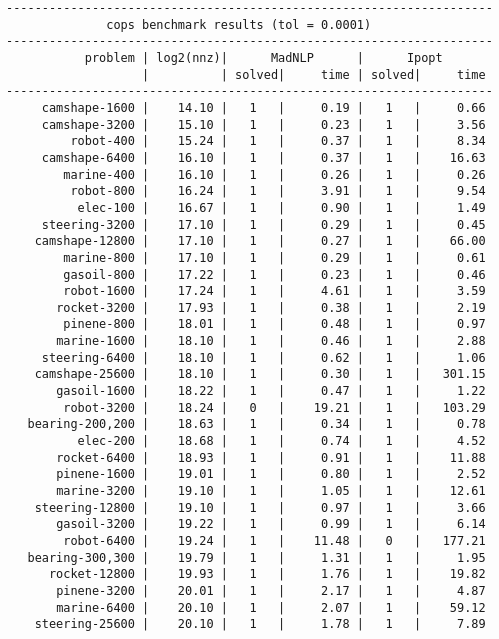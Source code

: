 \begin{lstlisting}
--------------------------------------------------------------------
              cops benchmark results (tol = 0.0001)
--------------------------------------------------------------------
           problem | log2(nnz)|      MadNLP      |      Ipopt        
                   |          | solved|     time | solved|     time     
--------------------------------------------------------------------
     camshape-1600 |    14.10 |   1   |     0.19 |   1   |     0.66
     camshape-3200 |    15.10 |   1   |     0.23 |   1   |     3.56
         robot-400 |    15.24 |   1   |     0.37 |   1   |     8.34
     camshape-6400 |    16.10 |   1   |     0.37 |   1   |    16.63
        marine-400 |    16.10 |   1   |     0.26 |   1   |     0.26
         robot-800 |    16.24 |   1   |     3.91 |   1   |     9.54
          elec-100 |    16.67 |   1   |     0.90 |   1   |     1.49
     steering-3200 |    17.10 |   1   |     0.29 |   1   |     0.45
    camshape-12800 |    17.10 |   1   |     0.27 |   1   |    66.00
        marine-800 |    17.10 |   1   |     0.29 |   1   |     0.61
        gasoil-800 |    17.22 |   1   |     0.23 |   1   |     0.46
        robot-1600 |    17.24 |   1   |     4.61 |   1   |     3.59
       rocket-3200 |    17.93 |   1   |     0.38 |   1   |     2.19
        pinene-800 |    18.01 |   1   |     0.48 |   1   |     0.97
       marine-1600 |    18.10 |   1   |     0.46 |   1   |     2.88
     steering-6400 |    18.10 |   1   |     0.62 |   1   |     1.06
    camshape-25600 |    18.10 |   1   |     0.30 |   1   |   301.15
       gasoil-1600 |    18.22 |   1   |     0.47 |   1   |     1.22
        robot-3200 |    18.24 |   0   |    19.21 |   1   |   103.29
   bearing-200,200 |    18.63 |   1   |     0.34 |   1   |     0.78
          elec-200 |    18.68 |   1   |     0.74 |   1   |     4.52
       rocket-6400 |    18.93 |   1   |     0.91 |   1   |    11.88
       pinene-1600 |    19.01 |   1   |     0.80 |   1   |     2.52
       marine-3200 |    19.10 |   1   |     1.05 |   1   |    12.61
    steering-12800 |    19.10 |   1   |     0.97 |   1   |     3.66
       gasoil-3200 |    19.22 |   1   |     0.99 |   1   |     6.14
        robot-6400 |    19.24 |   1   |    11.48 |   0   |   177.21
   bearing-300,300 |    19.79 |   1   |     1.31 |   1   |     1.95
      rocket-12800 |    19.93 |   1   |     1.76 |   1   |    19.82
       pinene-3200 |    20.01 |   1   |     2.17 |   1   |     4.87
       marine-6400 |    20.10 |   1   |     2.07 |   1   |    59.12
    steering-25600 |    20.10 |   1   |     1.78 |   1   |     7.89

\end{lstlisting}
